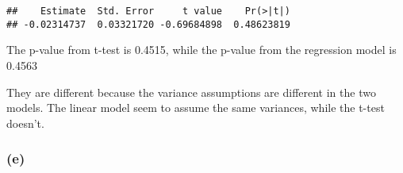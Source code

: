 \documentclass[]{article}
\newenvironment{Shaded}{\begin{snugshade}}{\end{snugshade}}
\newcommand{\CommentTok}[1]{\textcolor[rgb]{0.56,0.35,0.01}{\textit{#1}}}
\newcommand{\DecValTok}[1]{\textcolor[rgb]{0.00,0.00,0.81}{#1}}
\newcommand{\KeywordTok}[1]{\textcolor[rgb]{0.13,0.29,0.53}{\textbf{#1}}}
\newcommand{\NormalTok}[1]{#1}
\newcommand{\OperatorTok}[1]{\textcolor[rgb]{0.81,0.36,0.00}{\textbf{#1}}}
\newcommand{\StringTok}[1]{\textcolor[rgb]{0.31,0.60,0.02}{#1}}
\begin{document}
\begin{Shaded}
\end{Shaded}

\begin{verbatim}
##    Estimate  Std. Error     t value    Pr(>|t|) 
## -0.02314737  0.03321720 -0.69684898  0.48623819
\end{verbatim}

The p-value from t-test is 0.4515, while the p-value from the regression
model is 0.4563

They are different because the variance assumptions are different in the
two models. The linear model seem to assume the same variances, while
the t-test doesn't.

\hypertarget{e-1}{%
\subsubsection{(e)}\label{e-1}}

\begin{Shaded}
\end{Shaded}
\end{document}
